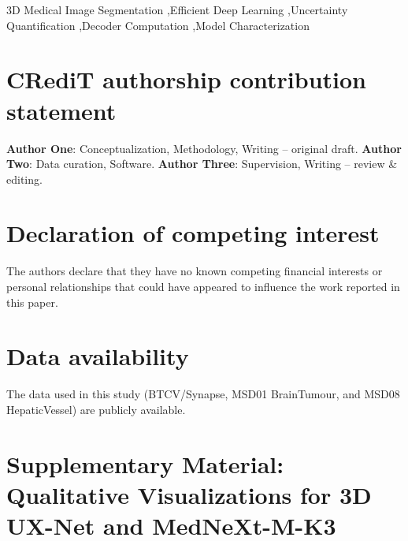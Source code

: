 \documentclass[final,5p,times,twocolumn]{elsarticle}
\begin{document}
\begin{frontmatter}
\begin{keyword}
3D Medical Image Segmentation \sep Efficient Deep Learning \sep Uncertainty Quantification \sep Decoder Computation \sep Model Characterization
\end{keyword}

\end{frontmatter}






\FloatBarrier %

\FloatBarrier

\section*{CRediT authorship contribution statement}
\textbf{Author One}: Conceptualization, Methodology, Writing – original draft. \textbf{Author Two}: Data curation, Software. \textbf{Author Three}: Supervision, Writing – review \& editing.

\section*{Declaration of competing interest}
The authors declare that they have no known competing financial interests or personal relationships that could have appeared to influence the work reported in this paper.

\section*{Data availability}
The data used in this study (BTCV/Synapse, MSD01 BrainTumour, and MSD08 HepaticVessel) are publicly available.

 


\clearpage
\appendix
\renewcommand{\thefigure}{S\arabic{figure}}
\renewcommand{\thetable}{S\arabic{table}}
\setcounter{figure}{0}
\setcounter{table}{0}

\section*{Supplementary Material: Qualitative Visualizations for 3D UX-Net and MedNeXt-M-K3}
\end{document}

